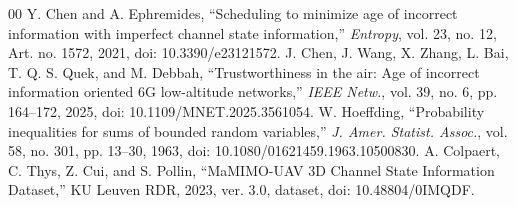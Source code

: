 \documentclass[conference]{IEEEtran}
\begin{document}
\begin{thebibliography}{00}
 Y. Chen and A. Ephremides, ``Scheduling to minimize age of incorrect information with imperfect channel state information,'' \emph{Entropy}, vol. 23, no. 12, Art. no. 1572, 2021, doi: 10.3390/e23121572.
 J. Chen, J. Wang, X. Zhang, L. Bai, T. Q. S. Quek, and M. Debbah, ``Trustworthiness in the air: Age of incorrect information oriented 6G low-altitude networks,'' \emph{IEEE Netw.}, vol. 39, no. 6, pp. 164--172, 2025, doi: 10.1109/MNET.2025.3561054.
 W. Hoeffding, ``Probability inequalities for sums of bounded random variables,'' \emph{J. Amer. Statist. Assoc.}, vol. 58, no. 301, pp. 13--30, 1963, doi: 10.1080/01621459.1963.10500830.
 A. Colpaert, C. Thys, Z. Cui, and S. Pollin, ``MaMIMO-UAV 3D Channel State Information Dataset,'' KU Leuven RDR, 2023, ver. 3.0, dataset, doi: 10.48804/0IMQDF.
\end{thebibliography}
\end{document}
